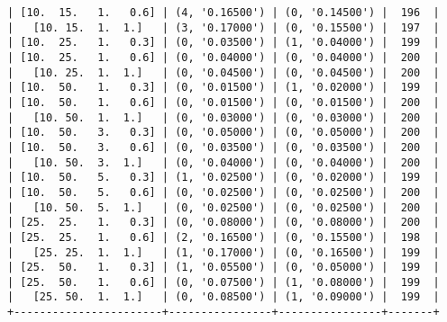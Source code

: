 \documentclass{article}
\begin{document}
\begin{verbatim}
| [10.  15.   1.   0.6] | (4, '0.16500') | (0, '0.14500') |  196  |
|   [10. 15.  1.  1.]   | (3, '0.17000') | (0, '0.15500') |  197  |
| [10.  25.   1.   0.3] | (0, '0.03500') | (1, '0.04000') |  199  |
| [10.  25.   1.   0.6] | (0, '0.04000') | (0, '0.04000') |  200  |
|   [10. 25.  1.  1.]   | (0, '0.04500') | (0, '0.04500') |  200  |
| [10.  50.   1.   0.3] | (0, '0.01500') | (1, '0.02000') |  199  |
| [10.  50.   1.   0.6] | (0, '0.01500') | (0, '0.01500') |  200  |
|   [10. 50.  1.  1.]   | (0, '0.03000') | (0, '0.03000') |  200  |
| [10.  50.   3.   0.3] | (0, '0.05000') | (0, '0.05000') |  200  |
| [10.  50.   3.   0.6] | (0, '0.03500') | (0, '0.03500') |  200  |
|   [10. 50.  3.  1.]   | (0, '0.04000') | (0, '0.04000') |  200  |
| [10.  50.   5.   0.3] | (1, '0.02500') | (0, '0.02000') |  199  |
| [10.  50.   5.   0.6] | (0, '0.02500') | (0, '0.02500') |  200  |
|   [10. 50.  5.  1.]   | (0, '0.02500') | (0, '0.02500') |  200  |
| [25.  25.   1.   0.3] | (0, '0.08000') | (0, '0.08000') |  200  |
| [25.  25.   1.   0.6] | (2, '0.16500') | (0, '0.15500') |  198  |
|   [25. 25.  1.  1.]   | (1, '0.17000') | (0, '0.16500') |  199  |
| [25.  50.   1.   0.3] | (1, '0.05500') | (0, '0.05000') |  199  |
| [25.  50.   1.   0.6] | (0, '0.07500') | (1, '0.08000') |  199  |
|   [25. 50.  1.  1.]   | (0, '0.08500') | (1, '0.09000') |  199  |
+-----------------------+----------------+----------------+-------+
\end{verbatim}
\end{document}
